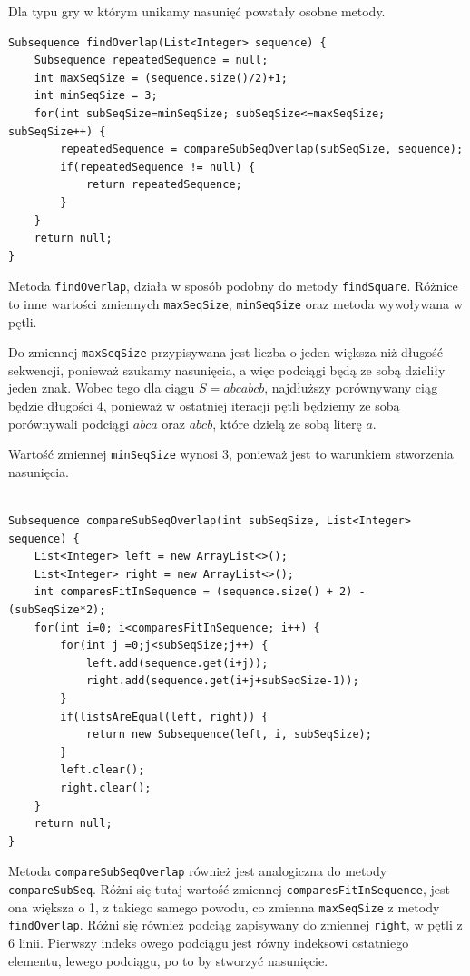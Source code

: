 \documentclass[document]{xmgr}
\begin{document}
Dla typu gry w którym unikamy nasunięć powstały osobne metody.

\begin{lstlisting}[frame=single]
Subsequence findOverlap(List<Integer> sequence) {
	Subsequence repeatedSequence = null;
	int maxSeqSize = (sequence.size()/2)+1;
	int minSeqSize = 3;
	for(int subSeqSize=minSeqSize; subSeqSize<=maxSeqSize; subSeqSize++) {
		repeatedSequence = compareSubSeqOverlap(subSeqSize, sequence);
		if(repeatedSequence != null) {
			return repeatedSequence;
		}
	}
	return null;
}
\end{lstlisting}

Metoda \texttt{findOverlap}, działa w sposób podobny do metody \texttt{findSquare}. Różnice to inne wartości zmiennych \texttt{maxSeqSize}, \texttt{minSeqSize} oraz metoda wywoływana w pętli.

Do zmiennej \texttt{maxSeqSize} przypisywana jest liczba o jeden większa niż długość sekwencji, ponieważ szukamy nasunięcia, a więc podciągi będą ze sobą dzieliły jeden znak. Wobec tego dla ciągu $S = abcabcb$, najdłuższy porównywany ciąg będzie długości 4, ponieważ w ostatniej iteracji pętli będziemy ze sobą porównywali podciągi $abca$ oraz $abcb$, które dzielą ze sobą literę $a$.

Wartość zmiennej \texttt{minSeqSize} wynosi 3, ponieważ jest to warunkiem stworzenia nasunięcia.

\begin{lstlisting}[frame=single]

Subsequence compareSubSeqOverlap(int subSeqSize, List<Integer> sequence) {
	List<Integer> left = new ArrayList<>();
	List<Integer> right = new ArrayList<>();
	int comparesFitInSequence = (sequence.size() + 2) - (subSeqSize*2);
	for(int i=0; i<comparesFitInSequence; i++) {
		for(int j =0;j<subSeqSize;j++) {
			left.add(sequence.get(i+j));
			right.add(sequence.get(i+j+subSeqSize-1));
		}
		if(listsAreEqual(left, right)) {
			return new Subsequence(left, i, subSeqSize);
		}
		left.clear();
		right.clear();
	}
	return null;
} 
\end{lstlisting}

Metoda \texttt{compareSubSeqOverlap} również jest analogiczna do metody \texttt{compareSubSeq}. Różni się tutaj wartość zmiennej \texttt{comparesFitInSequence}, jest ona większa o 1, z takiego samego powodu, co zmienna \texttt{maxSeqSize} z metody \texttt{findOverlap}. Różni się również podciąg zapisywany do zmiennej \texttt{right}, w pętli z 6 linii. Pierwszy indeks owego podciągu jest równy indeksowi ostatniego elementu, lewego podciągu, po to by stworzyć nasunięcie.
\end{document}
